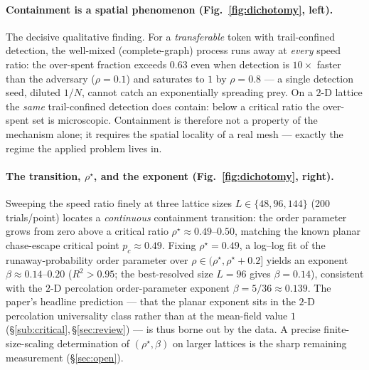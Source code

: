 \documentclass[11pt]{article}
\theoremstyle{plain}
\theoremstyle{definition}
\begin{document}
\paragraph{Containment is a spatial phenomenon (Fig.~\ref{fig:dichotomy}, left).}
The decisive qualitative finding. For a \emph{transferable} token with
trail-confined detection, the well-mixed (complete-graph) process runs away at
\emph{every} speed ratio: the over-spent fraction exceeds $0.63$ even when
detection is $10\times$ faster than the adversary ($\rho=0.1$) and saturates to $1$
by $\rho=0.8$ --- a single detection seed, diluted $1/N$, cannot catch an
exponentially spreading prey. On a $2$-D lattice the \emph{same} trail-confined
detection does contain: below a critical ratio the over-spent set is microscopic.
Containment is therefore not a property of the mechanism alone; it requires the
spatial locality of a real mesh --- exactly the regime the applied problem lives in.

\paragraph{The transition, $\rho^\star$, and the exponent (Fig.~\ref{fig:dichotomy}, right).}
Sweeping the speed ratio finely at three lattice sizes $L\in\{48,96,144\}$
(200 trials/point) locates a \emph{continuous} containment transition: the order
parameter grows from zero above a critical ratio $\rho^\star\approx0.49$--$0.50$,
matching the known planar chase-escape critical point $p_c\approx0.49$. Fixing
$\rho^\star=0.49$, a log--log fit of the runaway-probability order parameter over
$\rho\in(\rho^\star,\rho^\star+0.2]$ yields an exponent $\beta\approx0.14$--$0.20$
($R^2>0.95$; the best-resolved size $L=96$ gives $\beta=0.14$), consistent with the
$2$-D percolation order-parameter exponent $\beta=5/36\approx0.139$. The paper's
headline prediction --- that the planar exponent sits in the $2$-D percolation
universality class rather than at the mean-field value $1$
(\S\ref{sub:critical},\,\S\ref{sec:review}) --- is thus borne out by the data. A
precise finite-size-scaling determination of $(\rho^\star,\beta)$ on larger lattices
is the sharp remaining measurement (\S\ref{sec:open}).
\end{document}
